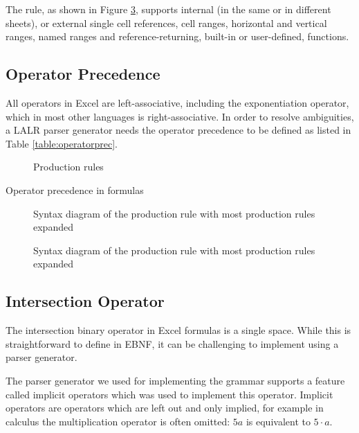 \documentclass[conference]{IEEEtran}
\begin{document}
The  rule, as shown in Figure \ref{figure:Reference}, supports internal (in the same or in different sheets), or external single cell references, cell ranges, horizontal and vertical ranges, named ranges and reference-returning, built-in or user-defined, functions.

\subsection{Operator Precedence}
\label{sec:operatorprecedence}

All operators in Excel are left-associative, including the exponentiation operator, which in most other languages is right-associative.
In order to resolve ambiguities, a LALR parser generator needs the operator precedence to be defined as listed in Table \ref{table:operatorprec}.

\begin{figure}[p]
\centering

\caption{Production rules}
\label{figure:productions}
\end{figure}

\begin{table}[p]
	\centering
	\caption{Operator precedence in formulas}
	\label{table:operatorprec}
	
\end{table}

\begin{figure}[p]
	
	\caption{Syntax diagram of the  production rule with most production rules expanded}
	\label{figure:Formula}
\end{figure}

\begin{figure}[p]
	\centering
	
	\caption{Syntax diagram of the  production rule with most production rules expanded}
	\label{figure:Reference}
\end{figure}

\subsection{Intersection Operator}

The intersection binary operator in Excel formulas is a single space.
While this is straightforward to define in EBNF, it can be challenging to implement using a parser generator.

The parser generator we used for implementing the grammar supports a feature called implicit operators which was used to implement this operator.
Implicit operators are operators which are left out and only implied, for example in calculus the multiplication operator is often omitted: $5a$ is equivalent to $5 \cdot a$.
\end{document}
